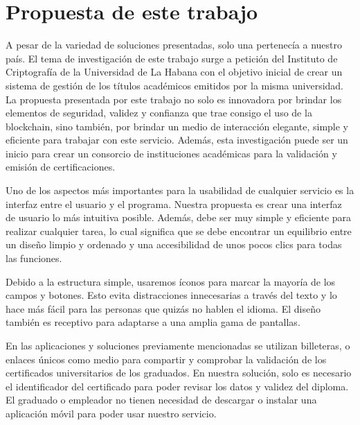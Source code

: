 
\section{Propuesta de este trabajo}
A pesar de la variedad de soluciones presentadas, solo una pertenecía a nuestro país. El tema de investigación de este trabajo surge a petición del Instituto de Criptografía de la Universidad de La Habana con el objetivo inicial de crear un sistema de gestión de los títulos académicos emitidos por la misma universidad. La propuesta presentada por este trabajo no solo es innovadora por brindar los elementos de seguridad, validez y confianza que trae consigo el uso de la blockchain, sino también, por brindar un medio de interacción elegante, simple y eficiente para trabajar con este servicio. Además, esta investigación puede ser un inicio para crear un consorcio de instituciones académicas para la validación y emisión de certificaciones.

Uno de los aspectos más importantes para la usabilidad de cualquier servicio es la interfaz entre el usuario y el programa. Nuestra propuesta es crear una interfaz de usuario lo más intuitiva posible. Además, debe ser muy simple y eficiente para realizar cualquier tarea, lo cual significa que se debe encontrar un equilibrio entre un diseño limpio y ordenado y una accesibilidad de unos pocos clics para todas las funciones.

Debido a la estructura simple, usaremos íconos para marcar la mayoría de los campos y botones. Esto evita distracciones innecesarias a través del texto y lo hace más fácil para las personas que quizás no hablen el idioma. El diseño también es receptivo para adaptarse a una amplia gama de pantallas.

En las aplicaciones y soluciones previamente mencionadas se utilizan billeteras, o enlaces únicos como medio para compartir y comprobar la validación de los certificados universitarios de los graduados. En nuestra solución, solo es necesario el identificador del certificado para poder revisar los datos y validez del diploma. El graduado o empleador no tienen necesidad de descargar o instalar una aplicación móvil para poder usar nuestro servicio.

